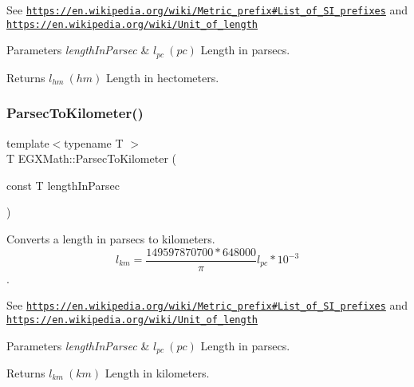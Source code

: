 See \href{https://en.wikipedia.org/wiki/Metric_prefix#List_of_SI_prefixes}{\tt https\+://en.\+wikipedia.\+org/wiki/\+Metric\+\_\+prefix\#\+List\+\_\+of\+\_\+\+S\+I\+\_\+prefixes} and \href{https://en.wikipedia.org/wiki/Unit_of_length}{\tt https\+://en.\+wikipedia.\+org/wiki/\+Unit\+\_\+of\+\_\+length} 
\begin{DoxyParams}{Parameters}
{\em length\+In\+Parsec} & $ l_{pc}\ (pc)$ Length in parsecs. \\
\hline
\end{DoxyParams}
\begin{DoxyReturn}{Returns}
$ l_{hm}\ (hm)$ Length in hectometers. 
\end{DoxyReturn}
\mbox{\label{group___e_g_x_math-_conversions-_length_conversions-_astronomical-_parsec-_s_i_gae7136d7d0b81221c5c71de565648fb93}} 
\subsubsection{\texorpdfstring{Parsec\+To\+Kilometer()}{ParsecToKilometer()}}
{\footnotesize\ttfamily template$<$typename T $>$ \\
T E\+G\+X\+Math\+::\+Parsec\+To\+Kilometer (\begin{DoxyParamCaption}\item[{const T}]{length\+In\+Parsec }\end{DoxyParamCaption})}



Converts a length in parsecs to kilometers. \[ l_{km}=\frac{149597870700 * 648000}{\pi}l_{pc} * 10^{-3} \]. 

See \href{https://en.wikipedia.org/wiki/Metric_prefix#List_of_SI_prefixes}{\tt https\+://en.\+wikipedia.\+org/wiki/\+Metric\+\_\+prefix\#\+List\+\_\+of\+\_\+\+S\+I\+\_\+prefixes} and \href{https://en.wikipedia.org/wiki/Unit_of_length}{\tt https\+://en.\+wikipedia.\+org/wiki/\+Unit\+\_\+of\+\_\+length} 
\begin{DoxyParams}{Parameters}
{\em length\+In\+Parsec} & $ l_{pc}\ (pc)$ Length in parsecs. \\
\hline
\end{DoxyParams}
\begin{DoxyReturn}{Returns}
$ l_{km}\ (km)$ Length in kilometers. 
\end{DoxyReturn}
\mbox{\label{group___e_g_x_math-_conversions-_length_conversions-_astronomical-_parsec-_s_i_ga2b7c62d851d25cb2041e3bc339110790}} 
